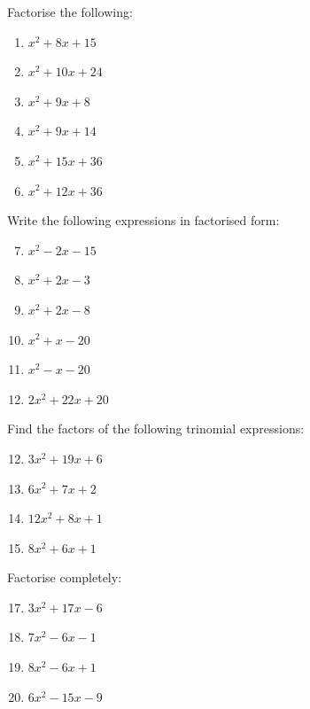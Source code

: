 \noindent
\label{m39394*secfhsst!!!underscore!!!id2756}
\begin{exercises}{}
{
Factorise the following:
\begin{multicols}{2}
\begin{enumerate}[itemsep=5pt, label=\textbf{\arabic*}. ] 
\item ${x}^{2}+8x+15$
\item ${x}^{2}+10x+24$
\item ${x}^{2}+9x+8$
\item ${x}^{2}+9x+14$
\item ${x}^{2}+15x+36$
\item ${x}^{2}+12x+36$
\end{enumerate}
\end{multicols}


Write the following expressions in factorised form:
\begin{multicols}{2}
\begin{enumerate}[itemsep=5pt, label=\textbf{\arabic*}. ] 
\setcounter{enumi}{6}
\item ${x}^{2}-2x-15$
\item ${x}^{2}+2x-3$
\item ${x}^{2}+2x-8$
\item ${x}^{2}+x-20$
\item ${x}^{2}-x-20$
\item $2{x}^{2}+22x+20$
\end{enumerate}
\end{multicols}


Find the factors of the following trinomial expressions:
\begin{multicols}{2}
\begin{enumerate}[itemsep=5pt, label=\textbf{\arabic*}. ] 
\setcounter{enumi}{11}

\item $3{x}^{2}+19x+6$
\item $6{x}^{2}+7x+2$
\item $12{x}^{2}+8x+1$
\item $8{x}^{2}+6x+1$
\end{enumerate}
\end{multicols}

Factorise completely:
\begin{multicols}{2}
\begin{enumerate}[itemsep=5pt, label=\textbf{\arabic*}. ] 
\setcounter{enumi}{16}
\item $3{x}^{2}+17x-6$
\item $7{x}^{2}-6x-1$
\item $8{x}^{2}-6x+1$
\item $6{x}^{2}-15x-9$
\end{enumerate}
\end{multicols}


}
\end{exercises}
